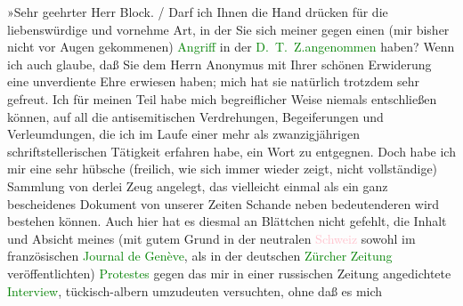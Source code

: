 {{{                        »Sehr geehrter Herr Block.{ / }Darf ich Ihnen die Hand drücken für die liebenswürdige und vornehme Art, in
                        der Sie sich meiner gegen einen (mir bisher nicht vor Augen gekommenen) \textcolor{green}{Angriff} in der \textcolor{green}{D. T. Z.}\textcolor{green}{angenommen} haben?
                        Wenn ich auch glaube, daß Sie dem Herrn Anonymus mit Ihrer schönen
                        Erwiderung eine unverdiente Ehre erwiesen haben; mich hat sie natürlich
                        trotzdem sehr gefreut. Ich für meinen Teil habe mich begreiflicher Weise
                        niemals entschließen können, auf all die antisemitischen Verdrehungen,
                        Begeiferungen und Verleumdungen, die ich im Laufe einer mehr als
                        zwanzigjährigen schriftstellerischen Tätigkeit erfahren habe, ein Wort zu
                        entgegnen. Doch habe ich mir eine sehr hübsche (freilich, wie sich immer
                        wieder zeigt, nicht vollständige) Sammlung von derlei Zeug angelegt, das
                        vielleicht einmal als ein ganz bescheidenes Dokument von unserer Zeiten
                        Schande neben bedeutenderen wird bestehen können. Auch hier hat es diesmal
                        an Blättchen nicht gefehlt, die Inhalt und Absicht meines (mit gutem Grund
                        in der neutralen \textcolor{pink}{Schweiz} sowohl im
                        französischen \textcolor{green}{Journal de Genève}, als in der
                        deutschen \textcolor{green}{Zürcher Zeitung} veröffentlichten) \textcolor{green}{Protestes} gegen das mir in
                        einer russischen Zeitung angedichtete \textcolor{green}{Interview}, tückisch-albern umzudeuten versuchten, ohne daß es mich
}}}
